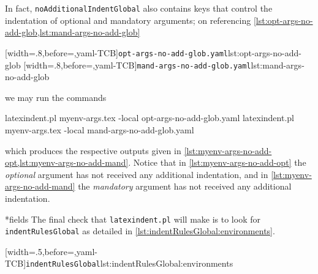  \begin{example}
 In fact, \texttt{noAdditionalIndentGlobal} also contains keys that control the
 indentation of optional and mandatory arguments; on referencing
 \cref{lst:opt-args-no-add-glob,lst:mand-args-no-add-glob}

 \begin{cmhtcbraster}
  [width=.8\linewidth,before=\centering,yaml-TCB]{\texttt{opt-args-no-add-glob.yaml}}{lst:opt-args-no-add-glob}
  [width=.8\linewidth,before=\centering,yaml-TCB]{\texttt{mand-args-no-add-glob.yaml}}{lst:mand-args-no-add-glob}
 \end{cmhtcbraster}

 we may run the commands 

 \begin{commandshell}
latexindent.pl myenv-args.tex -local opt-args-no-add-glob.yaml
latexindent.pl myenv-args.tex -local mand-args-no-add-glob.yaml
\end{commandshell}

 which produces the respective outputs given in
 \cref{lst:myenv-args-no-add-opt,lst:myenv-args-no-add-mand}. Notice that in
 \cref{lst:myenv-args-no-add-opt} the \emph{optional} argument has not received any
 additional indentation, and in \cref{lst:myenv-args-no-add-mand} the \emph{mandatory}
 argument has not received any additional indentation.

 \begin{cmhtcbraster}
 \end{cmhtcbraster}
 \end{example}

*{fields}
 The final check that \texttt{latexindent.pl} will make is to look for
 \texttt{indentRulesGlobal} as detailed in \cref{lst:indentRulesGlobal:environments}.

 [width=.5\linewidth,before=\centering,yaml-TCB]{\texttt{indentRulesGlobal}}{lst:indentRulesGlobal:environments}

